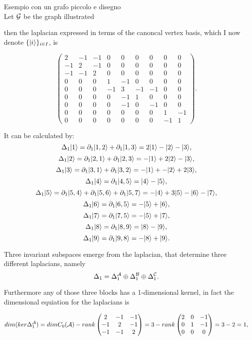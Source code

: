 \documentclass[../2.tex]{subfiles}
\begin{document}
    {\color{red} Esempio con un grafo piccolo e disegno \\

    Let $\mathcal{G}$ be the graph illustrated 
    
    then the laplacian expressed in terms of the canoncal vertex basis, which I now denote $\{| i \rangle\}_{i \in I}$, is

    \[\begin{pmatrix}
            2 & -1 & -1 & 0 & 0 & 0 & 0 & 0 & 0 \\
            -1 & 2 & -1 & 0 & 0 & 0 & 0 & 0 & 0 \\
            -1 & -1 & 2 & 0 & 0 & 0 & 0 & 0 & 0 \\
            0 & 0 & 0 & 1 & -1 & 0 & 0 & 0 & 0 \\
            0 & 0 & 0 & -1 & 3 & -1 & -1 & 0 & 0 \\
            0 & 0 & 0 & 0 & -1 & 1 & 0 & 0 & 0 \\
            0 & 0 & 0 & 0 & -1 & 0 & -1 & 0 & 0 \\
            0 & 0 & 0 & 0 & 0 & 0 & 0 & 1 & -1 \\
            0 & 0 & 0 & 0 & 0 & 0 & 0 & -1 & 1 
        \end{pmatrix}. \] 

    It can be calculated by:
    \[ \Delta_1 | 1 \rangle = \partial_1| 1,2 \rangle + \partial_1| 1,3 \rangle = 2| 1 \rangle-| 2 \rangle-| 3 \rangle,\]
    \[ \Delta_1 | 2 \rangle = \partial_1| 2,1 \rangle + \partial_1| 2,3 \rangle = -| 1 \rangle+2| 2 \rangle-| 3 \rangle,\]
    \[ \Delta_1 | 3 \rangle = \partial_1| 3,1 \rangle + \partial_1| 3,2 \rangle = -| 1 \rangle+-| 2 \rangle+2| 3 \rangle,\]
    \[ \Delta_1 | 4 \rangle = \partial_1| 4,5 \rangle = | 4 \rangle-| 5 \rangle,\]
    \[ \Delta_1 | 5 \rangle = \partial_1| 5,4 \rangle+\partial_1| 5,6 \rangle+\partial_1| 5,7 \rangle = -| 4 \rangle+3| 5 \rangle-| 6 \rangle-| 7 \rangle,\]
    \[ \Delta_1 | 6 \rangle = \partial_1| 6,5 \rangle = -| 5 \rangle+| 6 \rangle,\]
    \[ \Delta_1 | 7 \rangle = \partial_1| 7,5 \rangle = -| 5 \rangle+| 7 \rangle,\]
    \[ \Delta_1 | 8 \rangle = \partial_1| 8,9 \rangle = | 8 \rangle-| 9 \rangle,\]
    \[ \Delta_1 | 9 \rangle = \partial_1| 9,8 \rangle = -| 8 \rangle+| 9 \rangle.\] 

    Three invariant subspaces emerge from the laplacian, that determine three different laplacians, namely
    \[ \Delta_1 = \Delta_1^{\mathcal{A}} \oplus \Delta_1^{\mathcal{B}} \oplus \Delta_1^{\mathcal{C}}. \]

    Furthermore any of those three blocks has a 1-dimensional kernel, in fact the dimensional equiation for the laplacians is

    \[dim(ker\Delta_1^{\mathcal{A}}) =dimC_0(\mathcal{A}) - rank
    \begin{pmatrix}
        2 & -1 & -1  \\
        -1 & 2 & -1  \\
        -1 & -1 & 2 
    \end{pmatrix} = 3 - rank
    \begin{pmatrix}
        2 & 0 & -1  \\
        0 & 1 & -1  \\
        0 & 0 & 0 
    \end{pmatrix} = 3 - 2 =  1, \]

}
\end{document}
